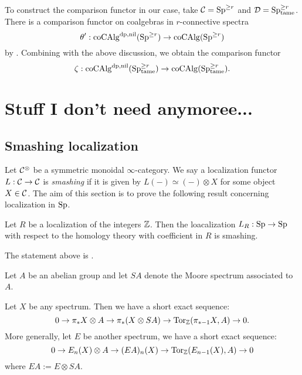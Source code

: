 To construct the comparison functor in our case, take ${\mathcal{C}}=\operatorname{Sp}^{\geq r}$ and ${\mathcal{D}}=\operatorname{Sp}^{\geq r}_{\operatorname{\operatorname{tame}}}$. There is a comparison functor on coalgebras in $r$-connective spectra
$$
\theta': \operatorname{coCAlg}^{\operatorname{dp}, \operatorname{nil}}(\operatorname{Sp}^{\geq r}) \to \operatorname{coCAlg}(\operatorname{Sp}^{\geq r})
$$
by \cite{Francis-Gaitsgory}.
Combining with the above discussion, we obtain the comparison functor
\[
\zeta:\operatorname{coCAlg}^{\operatorname{dp},\operatorname{nil}}(\operatorname{Sp}^{\geq r}_{\operatorname{\operatorname{tame}}}) \to
\operatorname{coCAlg}(\operatorname{Sp}^{\geq r}_{\operatorname{\operatorname{tame}}}).
\]











\section{Stuff I don't need anymoree...}

\subsection{Smashing localization}
Let ${\mathcal{C}}^{\otimes}$ be a symmetric monoidal $\infty$-category. We say a localization functor $L:{\mathcal{C}}\to{\mathcal{C}}$ is \emph{smashing} if it is given by $L(-)\simeq (-)\otimes X$ for some object $X\in{\mathcal{C}}$.
The aim of this section is to prove the following result concerning localization in $\operatorname{Sp}$.

\begin{proposition}
\label{HR is smashing}
	Let $R$ be a localization of the integers ${\mathbb{Z}}$. Then the loacalization $L_R:\operatorname{Sp}\to \operatorname{Sp}$ with respect to the homology theory with coefficient in $R$ is smashing.
\end{proposition}

\begin{remark}
	The statement above is \cite[Proposition 2.4]{BousfieldSpectra}.
\end{remark}

Let $A$ be an abelian group and let $SA$ denote the Moore spectrum associated to $A$. 
\begin{theorem}
	Let $X$ be any spectrum. Then we have a short exact sequence:
	\[
	0\to 
	\pi_{*}X\otimes A \to
	\pi_{*}(X\otimes S A)
	\to
	\operatorname{Tor}_{{\mathbb{Z}}}(\pi_{*-1}X, A)\to 
	0.
	\]
	More generally, let $E$ be another spectrum, we have a short exact sequence:
	\[
	0\to 
	E_n(X)\otimes A 
	\to
	(EA)_n(X)
	\to
	\operatorname{Tor}_{\mathbb{Z}}(E_{n-1}(X),A)
	\to
	0
	\]
	where $EA:= E\otimes SA$.
\end{theorem}

